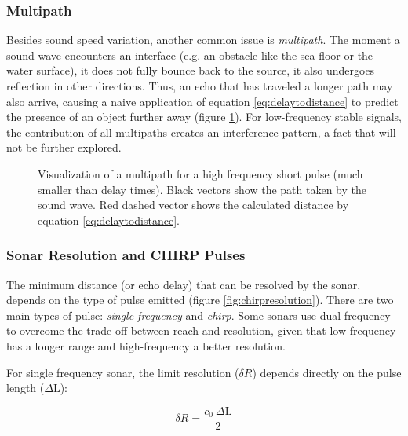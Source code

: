 \subsubsection{Multipath}


Besides sound speed variation, another common issue is \textit{multipath}. The
moment a sound wave encounters an interface (e.g. an obstacle like the sea floor
or the water surface), it does not fully bounce back to the source, it also undergoes
reflection in other directions. Thus, an echo that has traveled a longer
path may also arrive, causing a naive application of equation \ref{eq:delaytodistance} to
predict the presence of an object further away (figure \ref{fig:multipath}). For
low-frequency stable signals, the contribution of all multipaths creates an
interference pattern\cite{LURTON}, a fact that will not be further explored. 

\begin{figure}
	\centering
	
	\caption{Visualization of a multipath for a high frequency short pulse (much
	smaller than delay times). Black vectors show the path taken by the sound
	wave. Red dashed vector shows the calculated distance by equation
	\ref{eq:delaytodistance}.}
	\label{fig:multipath}
\end{figure}

\subsubsection{Sonar Resolution and CHIRP Pulses}

The minimum distance (or echo delay) that can be resolved by the sonar, depends
on the type of pulse emitted (figure \ref{fig:chirpresolution}). There are two
main types of pulse:
\textit{single frequency} and \textit{chirp}\cite{chirp,gaussianchirp}. Some
sonars use dual frequency to overcome the trade-off between reach and
resolution, given that low-frequency has a longer range and high-frequency a better resolution.

For single frequency sonar, the limit resolution ($\delta R$) depends directly
on the pulse length ($\Delta\text{L}$):

\[ \delta R = \frac{c_0~\Delta\text{L}}{2} \] 

